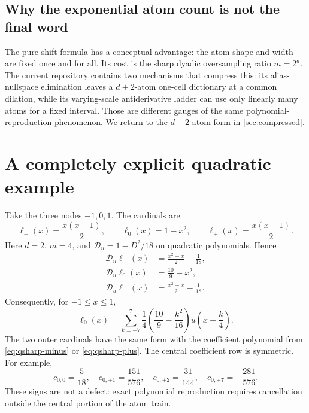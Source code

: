 \documentclass[11pt,oneside]{article}
\numberwithin{equation}{section}
\theoremstyle{definition}
\theoremstyle{remark}
\newcommand{\calD}{\mathscr D_u}
\begin{document}
\subsection{Why the exponential atom count is not the final word}
The pure-shift formula has a conceptual advantage: the atom shape and width are
fixed once and for all.  Its cost is the sharp dyadic oversampling ratio
\(m=2^d\).  The current repository contains two mechanisms that compress this:
its alias-nullspace elimination leaves a \(d+2\)-atom one-cell dictionary at a
common dilation, while its varying-scale antiderivative ladder can use only
linearly many atoms for a fixed interval.  Those are different gauges of the same
polynomial-reproduction phenomenon.  We return to the \(d+2\)-atom form in
\cref{sec:compressed}.

\section{A completely explicit quadratic example}
\label{sec:quadratic}
Take the three nodes \(-1,0,1\).  The cardinals are
\begin{equation}
 \ell_-(x)=\frac{x(x-1)}2,\qquad
 \ell_0(x)=1-x^2,\qquad
 \ell_+(x)=\frac{x(x+1)}2.
 \label{eq:qcards}
\end{equation}
Here \(d=2\), \(m=4\), and
\(\calD=1-D^2/18\) on quadratic polynomials.  Hence
\begin{align}
 \calD\ell_-(x)&=\frac{x^2-x}{2}-\frac1{18},\label{eq:qsharp-minus}\\
 \calD\ell_0(x)&=\frac{10}{9}-x^2,\label{eq:qsharp-zero}\\
 \calD\ell_+(x)&=\frac{x^2+x}{2}-\frac1{18}.\label{eq:qsharp-plus}
\end{align}
Consequently, for \(-1\le x\le1\),
\begin{equation}
 \boxed{
 \ell_0(x)=\sum_{k=-7}^{7}
 \frac14\left(\frac{10}{9}-\frac{k^2}{16}\right)
 u\!\left(x-\frac{k}{4}\right).}
 \label{eq:qcentral}
\end{equation}
The two outer cardinals have the same form with the coefficient polynomial from
\eqref{eq:qsharp-minus} or \eqref{eq:qsharp-plus}.  The central coefficient row is
symmetric.  For example,
\begin{equation}
 c_{0,0}=\frac5{18},\quad
 c_{0,\pm1}=\frac{151}{576},\quad
 c_{0,\pm2}=\frac{31}{144},\quad
 c_{0,\pm7}=-\frac{281}{576}.
 \label{eq:qcoeff-sample}
\end{equation}
These signs are not a defect: exact polynomial reproduction requires cancellation
outside the central portion of the atom train.
\end{document}
